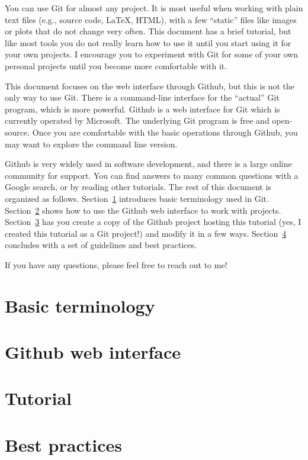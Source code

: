 \documentclass{article}
\begin{document}
You can use Git for almost any project.
It is most useful when working with plain text files (e.g., source code, \LaTeX, HTML), with a few ``static'' files like images or plots that do not change very often.
This document has a brief tutorial, but like most tools you do not really learn how to use it until you start using it for your own projects.
I encourage you to experiment with Git for some of your own personal projects until you become more comfortable with it.

This document focuses on the web interface through Github, but this is not the only way to use Git.
There is a command-line interface for the ``actual'' Git program, which is more powerful.
Github is a web interface for Git which is currently operated by Microsoft.
The underlying Git program is free and open-source.
Once you are comfortable with the basic operations through Github, you may want to explore the command line version.

Github is very widely used in software development, and there is a large online community for support.
You can find answers to many common questions with a Google search, or by reading other tutorials.
The rest of this document is organized as follows.
Section~\ref{sec:terminology} introduces basic terminology used in Git.
Section~\ref{sec:github} shows how to use the Github web interface to work with projects.
Section~\ref{sec:tutorial} has you create a copy of the Github project hosting this tutorial (yes, I created this tutorial as a Git project!) and modify it in a few ways.
Section~\ref{sec:bestpractices} concludes with a set of guidelines and best practices.

If you have any questions, please feel free to reach out to me!

\section{Basic terminology}
\label{sec:terminology}

\section{Github web interface}
\label{sec:github}

\section{Tutorial}
\label{sec:tutorial}

\section{Best practices}
\label{sec:bestpractices}
\end{document}
